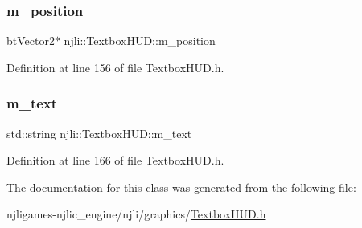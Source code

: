 \subsubsection{\texorpdfstring{m\+\_\+position}{m\_position}}
{\footnotesize\ttfamily bt\+Vector2$\ast$ njli\+::\+Textbox\+H\+U\+D\+::m\+\_\+position\hspace{0.3cm}{\ttfamily [private]}}



Definition at line 156 of file Textbox\+H\+U\+D.\+h.

\mbox{\label{classnjli_1_1_textbox_h_u_d_a60d9bc72cf0a7f5307dc3a65f6b15a6c}} 
\subsubsection{\texorpdfstring{m\+\_\+text}{m\_text}}
{\footnotesize\ttfamily std\+::string njli\+::\+Textbox\+H\+U\+D\+::m\+\_\+text\hspace{0.3cm}{\ttfamily [private]}}



Definition at line 166 of file Textbox\+H\+U\+D.\+h.



The documentation for this class was generated from the following file\+:\begin{DoxyCompactItemize}
\item 
njligames-\/njlic\+\_\+engine/njli/graphics/\mbox{\hyperlink{_textbox_h_u_d_8h}{Textbox\+H\+U\+D.\+h}}\end{DoxyCompactItemize}

